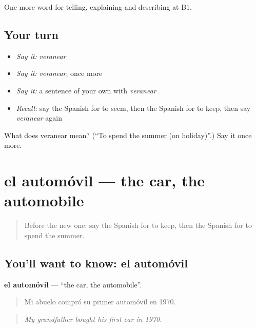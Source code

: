 \begin{grammarlens}[title={What you've built}]
One more word for telling, explaining and describing at B1.
\end{grammarlens}

\subsection*{Your turn}
\begin{itemize}
\raggedright
  \item \emph{Say it:} \emph{veranear}
  \item \emph{Say it:} \emph{veranear}, once more
  \item \emph{Say it:} a sentence of your own with \emph{veranear}
  \item \emph{Recall:} say the Spanish for to seem, then the Spanish for to keep, then say \emph{veranear} again
\end{itemize}

\begin{tcolorbox}[breakable,colback=teal!4,colframe=teal!35!black,title={Before you move on}]
What does veranear mean? (\textquotedblleft{}To spend the summer (on holiday)\textquotedblright{}.) Say it once more.
\end{tcolorbox}
\section[el automóvil]{el automóvil — the car, the automobile}

\label{lesson:ES-C640-automovil}



\begin{quote}
Before the new one: say the Spanish for to keep, then the Spanish for to spend the summer.
\end{quote}

\subsection*{You'll want to know: el automóvil}
\textbf{el automóvil} — \textquotedblleft{}the car, the automobile\textquotedblright{}.

\begin{quote}
Mi abuelo compró su primer automóvil en 1970.
\end{quote}

\begin{quote}
\emph{My grandfather bought his first car in 1970.}
\end{quote}

